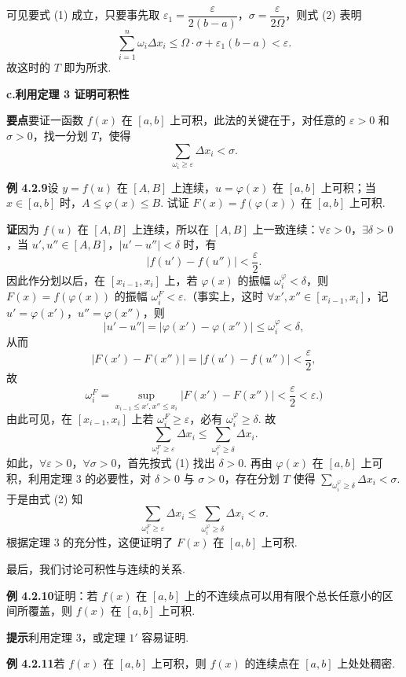 \documentclass[UTF8, 12pt, fontset=fandol, oneside]{ctexart}
\begin{document}
可见要式 (1) 成立，只要事先取 $\varepsilon_1=\dfrac{\varepsilon}{2(b-a)}$，$\sigma=\dfrac{\varepsilon}{2\Omega}$，则式 (2) 表明
\[
\sum_{i=1}^n\omega_i\Delta x_i\le\Omega\cdot\sigma+\varepsilon_1(b-a)<\varepsilon.
\]
故这时的 $T$ 即为所求.

\noindent\textbf{c.\quad 利用定理 3 证明可积性}

\noindent\textbf{要点}\quad 要证一函数 $f(x)$ 在 $[a,b]$ 上可积，此法的关键在于，对任意的 $\varepsilon>0$ 和 $\sigma>0$，找一分划 $T$，使得
\[
\sum_{\omega_i\ge\varepsilon}\Delta x_i<\sigma.
\]

\noindent\textbf{例 4.2.9}\quad 设 $y=f(u)$ 在 $[A,B]$ 上连续，$u=\varphi(x)$ 在 $[a,b]$ 上可积；当 $x\in[a,b]$ 时，$A\le\varphi(x)\le B$. 试证 $F(x)=f(\varphi(x))$ 在 $[a,b]$ 上可积.

\noindent\textbf{证}\quad 因为 $f(u)$ 在 $[A,B]$ 上连续，所以在 $[A,B]$ 上一致连续：$\forall\varepsilon>0$，$\exists\delta>0$，当 $u',u''\in[A,B]$，$|u'-u''|<\delta$ 时，有
\[
|f(u')-f(u'')|<\frac{\varepsilon}{2}.
\tag{1}
\]
因此作分划以后，在 $[x_{i-1},x_i]$ 上，若 $\varphi(x)$ 的振幅 $\omega_i^\varphi<\delta$，则 $F(x)=f(\varphi(x))$ 的振幅 $\omega_i^F<\varepsilon$.（事实上，这时 $\forall x',x''\in[x_{i-1},x_i]$，记 $u'=\varphi(x')$，$u''=\varphi(x'')$，则
\[
|u'-u''|=|\varphi(x')-\varphi(x'')|\le\omega_i^\varphi<\delta,
\]
从而
\[
|F(x')-F(x'')|=|f(u')-f(u'')|<\frac{\varepsilon}{2},
\]
故
\[
\omega_i^F=\sup_{x_{i-1}\le x',x''\le x_i}|F(x')-F(x'')|<\frac{\varepsilon}{2}<\varepsilon.)
\]
由此可见，在 $[x_{i-1},x_i]$ 上若 $\omega_i^F\ge\varepsilon$，必有 $\omega_i^\varphi\ge\delta$. 故
\[
\sum_{\omega_i^F\ge\varepsilon}\Delta x_i
\le
\sum_{\omega_i^\varphi\ge\delta}\Delta x_i.
\tag{2}
\]
如此，$\forall\varepsilon>0$，$\forall\sigma>0$，首先按式 (1) 找出 $\delta>0$. 再由 $\varphi(x)$ 在 $[a,b]$ 上可积，利用定理 3 的必要性，对 $\delta>0$ 与 $\sigma>0$，存在分划 $T$ 使得 $\sum_{\omega_i^\varphi\ge\delta}\Delta x_i<\sigma$. 于是由式 (2) 知
\[
\sum_{\omega_i^F\ge\varepsilon}\Delta x_i\le\sum_{\omega_i^\varphi\ge\delta}\Delta x_i<\sigma.
\]
根据定理 3 的充分性，这便证明了 $F(x)$ 在 $[a,b]$ 上可积.

最后，我们讨论可积性与连续的关系.

\noindent\textbf{例 4.2.10}\quad 证明：若 $f(x)$ 在 $[a,b]$ 上的不连续点可以用有限个总长任意小的区间所覆盖，则 $f(x)$ 在 $[a,b]$ 上可积.

\noindent\textbf{提示}\quad 利用定理 3，或定理 $1'$ 容易证明.

\noindent\textbf{例 4.2.11}\quad 若 $f(x)$ 在 $[a,b]$ 上可积，则 $f(x)$ 的连续点在 $[a,b]$ 上处处稠密.
\end{document}
